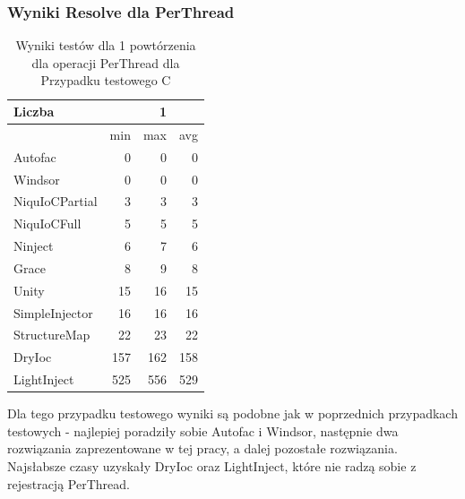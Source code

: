 \documentclass[12pt]{article}
\begin{document}
\subsubsection{Wyniki Resolve dla PerThread}
\begin{table}[H]
\captionsetup{belowskip=0pt,aboveskip=0pt}
\begin{center}
\begin{small}
	\begin{tabular}{ | l | r r r | }
    		\hline
Liczba & & 1 & \\ \hline
 & min & max & avg \\ \hline
Autofac & 0 & 0 & 0 \\ \hline
Windsor & 0 & 0 & 0 \\ \hline
NiquIoCPartial & 3 & 3 & 3 \\ \hline
NiquIoCFull & 5 & 5 & 5 \\ \hline
Ninject & 6 & 7 & 6 \\ \hline
Grace & 8 & 9 & 8 \\ \hline
Unity & 15 & 16 & 15 \\ \hline
SimpleInjector & 16 & 16 & 16 \\ \hline
StructureMap & 22 & 23 & 22 \\ \hline
DryIoc & 157 & 162 & 158 \\ \hline
LightInject & 525 & 556 & 529 \\ \hline
  	\end{tabular}
\end{small}
\end{center}
\caption{Wyniki testów dla 1 powtórzenia dla operacji PerThread dla Przypadku testowego C}
\label{TestCaseC_PerThread1}
\end{table}
Dla tego przypadku testowego wyniki są podobne jak w poprzednich przypadkach testowych - najlepiej poradziły sobie Autofac i Windsor, następnie dwa rozwiązania zaprezentowane w tej pracy, a dalej pozostałe rozwiązania. Najsłabsze czasy uzyskały DryIoc oraz LightInject, które nie radzą sobie z rejestracją PerThread.
\\ \\
\end{document}
